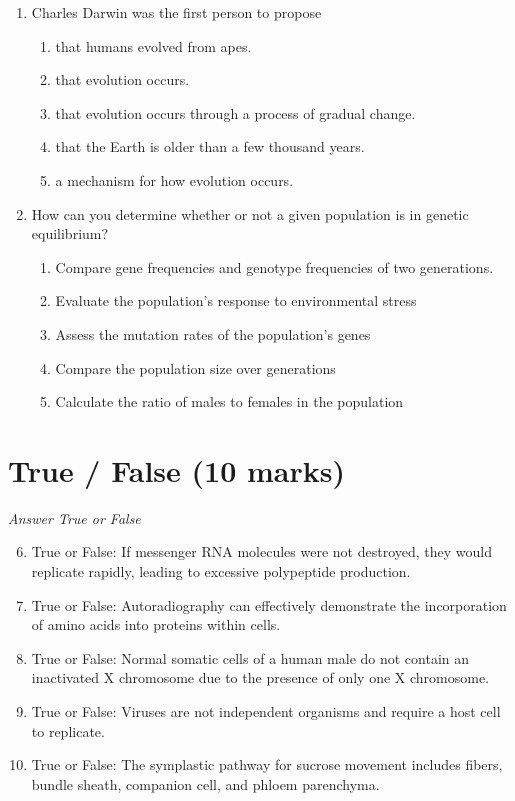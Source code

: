 \documentclass[12pt]{article}
\begin{document}
\begin{enumerate}[label=\arabic*.]
\begin{enumerate}[label=(\alph*)]
\end{enumerate}
\item Charles Darwin was the first person to propose
\begin{enumerate}[label=(\alph*)]
    \item that humans evolved from apes.
    \item that evolution occurs.
    \item that evolution occurs through a process of gradual change.
    \item that the Earth is older than a few thousand years.
    \item a mechanism for how evolution occurs.
\end{enumerate}
\item How can you determine whether or not a given population is in genetic equilibrium?
\begin{enumerate}[label=(\alph*)]
    \item Compare gene frequencies and genotype frequencies of two generations.
    \item Evaluate the population's response to environmental stress
    \item Assess the mutation rates of the population's genes
    \item Compare the population size over generations
    \item Calculate the ratio of males to females in the population
\end{enumerate}
\end{enumerate}

\section*{True / False (10 marks)}
\textit{Answer True or False}
\begin{enumerate}[label=\arabic*.]
\setcounter{enumi}{5}
\item True or False: If messenger RNA molecules were not destroyed, they would replicate rapidly, leading to excessive polypeptide production.
\item True or False: Autoradiography can effectively demonstrate the incorporation of amino acids into proteins within cells.
\item True or False: Normal somatic cells of a human male do not contain an inactivated X chromosome due to the presence of only one X chromosome.
\item True or False: Viruses are not independent organisms and require a host cell to replicate.
\item True or False: The symplastic pathway for sucrose movement includes fibers, bundle sheath, companion cell, and phloem parenchyma.
\end{enumerate}
\end{document}
